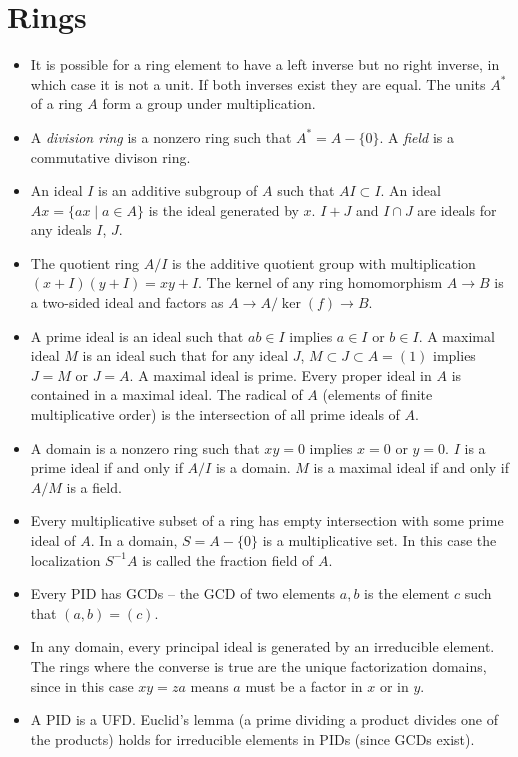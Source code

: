 \documentclass{article}
\begin{document}
\section{Rings}
\begin{itemize}
  \item{
    It is possible for a ring element to have a left inverse but no
    right inverse, in which case it is not a unit. If both inverses
    exist they are equal. The units $A^\ast$ of a ring $A$ form a
    group under multiplication.
  }
  \item{
    A \emph{division ring} is a nonzero ring such that $A^\ast = A -
    \{ 0 \}$. A \emph{field} is a commutative divison ring.
  }
  \item{
    An ideal $I$ is an additive subgroup of $A$ such that
    $AI \subset I$. An ideal $Ax = \{ax \mid a \in A\}$ is the ideal
    generated by $x$. $I + J$ and $I \cap J$ are ideals for any ideals
    $I$, $J$.
  }
  \item{
    The quotient ring $A / I$ is the additive quotient group with
    multiplication $(x + I)(y + I) = xy + I$. The kernel of any ring
    homomorphism $A \to B$ is a two-sided ideal and factors as
    $A \to A / \ker(f) \to B$.
  }
  \item{
    A prime ideal is an ideal such that $ab \in I$ implies $a \in I$
    or $b \in I$. A maximal ideal $M$ is an ideal such that for any
    ideal $J$, $M \subset J \subset A = (1)$ implies $J = M$ or
    $J = A$. A maximal ideal is prime. Every proper ideal in $A$ is
    contained in a maximal ideal. The radical of $A$ (elements of
    finite multiplicative order) is the intersection of all prime
    ideals of $A$.
  }
  \item{
    A domain is a nonzero ring such that $xy = 0$ implies $x = 0$ or
    $y = 0$. $I$ is a prime ideal if and only if $A / I$ is a
    domain. $M$ is a maximal ideal if and only if $A / M$ is a field.
  }
  \item{
    Every multiplicative subset of a ring has empty intersection with
    some prime ideal of $A$. In a domain, $S = A - \{ 0 \}$ is a
    multiplicative set. In this case the localization $S^{-1}A$ is
    called the fraction field of $A$.
  }
  \item{
    Every PID has GCDs -- the GCD of two elements $a, b$ is the
    element $c$ such that $(a, b) = (c)$.
  }
  \item{
    In any domain, every principal ideal is generated by an
    irreducible element. The rings where the converse is true are the
    unique factorization domains, since in this case $xy = za$ means
    $a$ must be a factor in $x$ or in $y$.
  }
  \item{
    A PID is a UFD. Euclid's lemma (a prime dividing a product divides
    one of the products) holds for irreducible elements in PIDs (since
    GCDs exist).
  }
\end{itemize}
\end{document}
